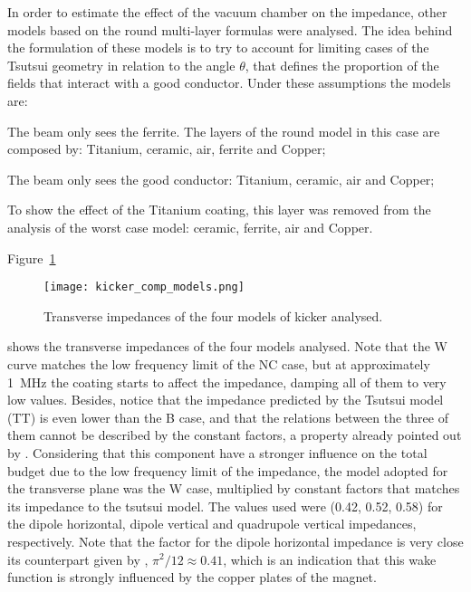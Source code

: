     In order to estimate the effect of the vacuum chamber on the impedance, other models based on the round multi-layer formulas were analysed. The idea behind the formulation of these models is to try to account for limiting cases of the Tsutsui geometry in relation to the angle $\theta$, that defines the proportion of the fields that interact with a good conductor. Under these assumptions the models are:
    \begin{description}[align=left]
        \item[Worst case (W):] The beam only sees the ferrite. The layers of the round model in this case are composed by: Titanium, ceramic, air, ferrite and Copper;
        \item[Best case (B):] The beam only sees the good conductor: Titanium, ceramic, air and Copper;
        \item[No Coating (NC):] To show the effect of the Titanium coating, this layer was removed from the analysis of the worst case model: ceramic, ferrite, air and Copper.
    \end{description}
    Figure~\ref{fig:uncoupled_flux_impedance}
    \begin{figure}[b!]
        \centering
        \texttt{[image: kicker\_comp\_models.png]}
        \caption{Transverse impedances of the four models of kicker analysed.}
        \label{fig:uncoupled_flux_impedance}
    \end{figure}
    shows the transverse impedances of the four models analysed. Note that the W curve matches the low frequency limit of the NC case, but at approximately \SI{1}{\mega\hertz} the coating starts to affect the impedance, damping all of them to very low values. Besides, notice that the impedance predicted by the Tsutsui model (TT) is even lower than the B case, and that the relations between the three of them cannot be described by the constant  factors, a property already pointed out by . Considering that this component have a stronger influence on the total budget due to the low frequency limit of the impedance, the model adopted for the transverse plane was the W case, multiplied by constant factors that matches its impedance to the tsutsui model. The values used were (0.42, 0.52, 0.58) for the dipole horizontal, dipole vertical and quadrupole vertical impedances, respectively. Note that the factor for the dipole horizontal impedance is very close its counterpart given by , $\pi^2/12 \approx 0.41$, which is an indication that this wake function is strongly influenced by the copper plates of the magnet.

